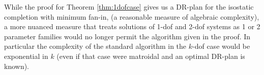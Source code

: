 \begin{observation*}
\label{obs:algebraic_completion}
    While the proof for Theorem \ref{thm:1dofcase} gives us a DR-plan for the isostatic completion with minimum fan-in, (a reasonable measure of algebraic complexity), a more nuanced measure that treats solutions of 1-dof and 2-dof systems as 1 or 2 parameter families would no longer permit the algorithm given in the proof. In particular the complexity of the standard algorithm in the $k$-dof case would be exponential in $k$ (even if that case were matroidal and an optimal DR-plan is known).
\end{observation*}





